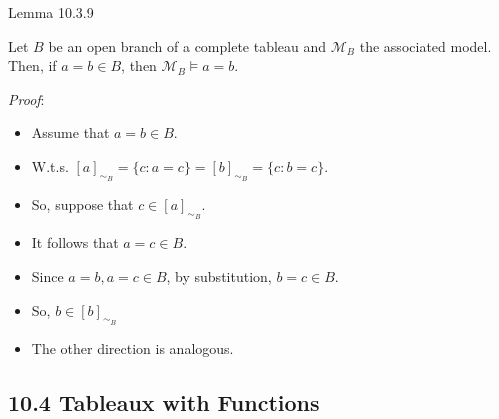\begin{frame}{Lemma 10.3.9}

Let $B$ be an open branch of a complete tableau and $\mathcal{M}_B$ the associated model. Then, if $a=b\in B$, then $\mathcal{M}_{B}\vDash a=b$.

\vspace{2ex}

\emph{Proof}:

\begin{itemize}

	\item Assume that $a=b\in B$.
	
	\item W.t.s. $[a]_{\sim_B}=\{c:a=c\}=[b]_{\sim_B}=\{c:b=c\}$.
	
	\item So, suppose that $c\in [a]_{\sim_B}$. 
	
	\item It follows that $a=c\in B$. 
	
	\item Since $a=b, a=c\in B$, by substitution, $b=c\in B$.
	
	\item So, $b\in [b]_{\sim_B}$
	
	\item The other direction is analogous.

\end{itemize}

\end{frame}

\subsection{10.4 Tableaux with Functions}

